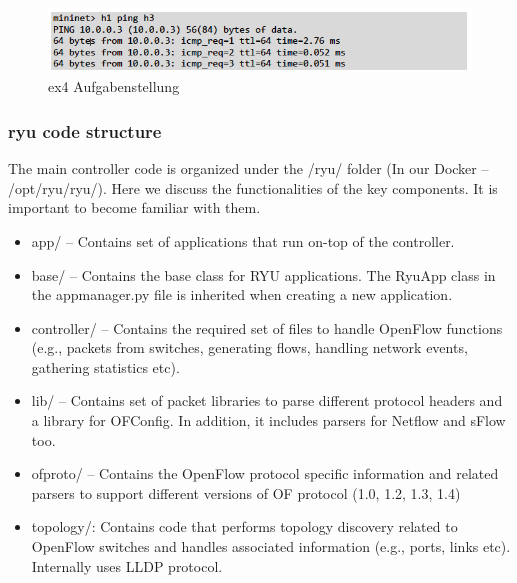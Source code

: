 \documentclass[a4,12pt]{scrartcl}
\begin{document}
\begin{figure} [H]
	\begin{center}
	\includegraphics[width=1.00\textwidth]{./pictures/ex4_aufgabenstellung4.png}
	\caption{ex4 Aufgabenstellung}
	\label{x}
	\end{center}
\end{figure} 

\subsubsection{ryu code structure}
The main controller code is organized under the /ryu/ folder (In our Docker – /opt/ryu/ryu/). Here we discuss the functionalities of the key components. It is important to become familiar with them.
\begin{itemize}
\item app/ – Contains set of applications that run on-top of the controller.
\item base/ – Contains the base class for RYU applications. The RyuApp class in the appmanager.py file is inherited when creating a new application.
\item controller/ – Contains the required set of files to handle OpenFlow functions (e.g., packets from switches, generating flows, handling network events, gathering statistics etc).
\item lib/ – Contains set of packet libraries to parse different protocol headers and a library for OFConfig. In addition, it includes parsers for Netflow and sFlow too.
\item ofproto/ – Contains the OpenFlow protocol specific information and related parsers to support different versions of OF protocol (1.0, 1.2, 1.3, 1.4)
\item topology/: Contains code that performs topology discovery related to OpenFlow switches and handles associated information (e.g., ports, links etc). Internally uses LLDP protocol.
\end{itemize}
\end{document}
